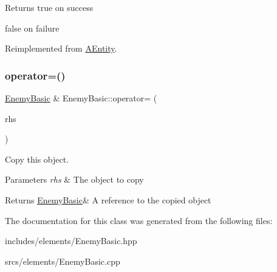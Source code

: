 \begin{DoxyReturn}{Returns}
true on success 

false on failure 
\end{DoxyReturn}


Reimplemented from \hyperlink{class_a_entity_a450361b684fa02e4ffe0ba406b8e3b30}{A\+Entity}.

\mbox{\label{class_enemy_basic_ab925c2ecf3e2358c727ba0a0cd751986}} 
\subsubsection{\texorpdfstring{operator=()}{operator=()}}
{\footnotesize\ttfamily \hyperlink{class_enemy_basic}{Enemy\+Basic} \& Enemy\+Basic\+::operator= (\begin{DoxyParamCaption}\item[{\hyperlink{class_enemy_basic}{Enemy\+Basic} const \&}]{rhs }\end{DoxyParamCaption})}



Copy this object. 


\begin{DoxyParams}{Parameters}
{\em rhs} & The object to copy \\
\hline
\end{DoxyParams}
\begin{DoxyReturn}{Returns}
\hyperlink{class_enemy_basic}{Enemy\+Basic}\& A reference to the copied object 
\end{DoxyReturn}


The documentation for this class was generated from the following files\+:\begin{DoxyCompactItemize}
\item 
includes/elements/Enemy\+Basic.\+hpp\item 
srcs/elements/Enemy\+Basic.\+cpp\end{DoxyCompactItemize}
